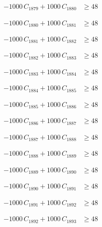 \documentclass[a4paper,11pt]{article}
\begin{document}
\begin{align}
-1000\,C_{1879} + 1000\,C_{1880} &\geq 48 \nonumber
\end{align}

\begin{align}
-1000\,C_{1880} + 1000\,C_{1881} &\geq 48 \nonumber
\end{align}

\begin{align}
-1000\,C_{1881} + 1000\,C_{1882} &\geq 48 \nonumber
\end{align}

\begin{align}
-1000\,C_{1882} + 1000\,C_{1883} &\geq 48 \nonumber
\end{align}

\begin{align}
-1000\,C_{1883} + 1000\,C_{1884} &\geq 48 \nonumber
\end{align}

\begin{align}
-1000\,C_{1884} + 1000\,C_{1885} &\geq 48 \nonumber
\end{align}

\begin{align}
-1000\,C_{1885} + 1000\,C_{1886} &\geq 48 \nonumber
\end{align}

\begin{align}
-1000\,C_{1886} + 1000\,C_{1887} &\geq 48 \nonumber
\end{align}

\begin{align}
-1000\,C_{1887} + 1000\,C_{1888} &\geq 48 \nonumber
\end{align}

\begin{align}
-1000\,C_{1888} + 1000\,C_{1889} &\geq 48 \nonumber
\end{align}

\begin{align}
-1000\,C_{1889} + 1000\,C_{1890} &\geq 48 \nonumber
\end{align}

\begin{align}
-1000\,C_{1890} + 1000\,C_{1891} &\geq 48 \nonumber
\end{align}

\begin{align}
-1000\,C_{1891} + 1000\,C_{1892} &\geq 48 \nonumber
\end{align}

\begin{align}
-1000\,C_{1892} + 1000\,C_{1893} &\geq 48 \nonumber
\end{align}
\end{document}
